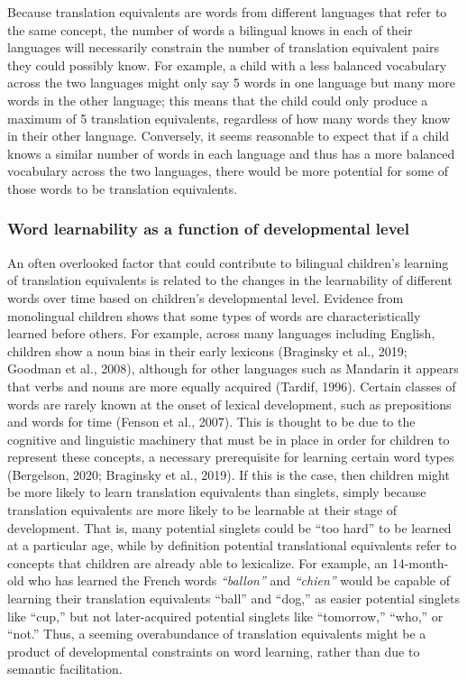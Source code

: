 \documentclass[
  english,
  ,man,floatsintext]{apa6}
\begin{document}
Because translation equivalents are words from different languages that refer to the same concept, the number of words a bilingual knows in each of their languages will necessarily constrain the number of translation equivalent pairs they could possibly know. For example, a child with a less balanced vocabulary across the two languages might only say 5 words in one language but many more words in the other language; this means that the child could only produce a maximum of 5 translation equivalents, regardless of how many words they know in their other language. Conversely, it seems reasonable to expect that if a child knows a similar number of words in each language and thus has a more balanced vocabulary across the two languages, there would be more potential for some of those words to be translation equivalents.

\hypertarget{word-learnability-as-a-function-of-developmental-level}{%
\subsubsection{Word learnability as a function of developmental level}\label{word-learnability-as-a-function-of-developmental-level}}

An often overlooked factor that could contribute to bilingual children's learning of translation equivalents is related to the changes in the learnability of different words over time based on children's developmental level. Evidence from monolingual children shows that some types of words are characteristically learned before others. For example, across many languages including English, children show a noun bias in their early lexicons (Braginsky et al., 2019; Goodman et al., 2008), although for other languages such as Mandarin it appears that verbs and nouns are more equally acquired (Tardif, 1996). Certain classes of words are rarely known at the onset of lexical development, such as prepositions and words for time (Fenson et al., 2007). This is thought to be due to the cognitive and linguistic machinery that must be in place in order for children to represent these concepts, a necessary prerequisite for learning certain word types (Bergelson, 2020; Braginsky et al., 2019). If this is the case, then children might be more likely to learn translation equivalents than singlets, simply because translation equivalents are more likely to be learnable at their stage of development. That is, many potential singlets could be ``too hard'' to be learned at a particular age, while by definition potential translational equivalents refer to concepts that children are already able to lexicalize. For example, an 14-month-old who has learned the French words \emph{``ballon''} and \emph{``chien''} would be capable of learning their translation equivalents ``ball'' and ``dog,'' as easier potential singlets like ``cup,'' but not later-acquired potential singlets like ``tomorrow,'' ``who,'' or ``not.'' Thus, a seeming overabundance of translation equivalents might be a product of developmental constraints on word learning, rather than due to semantic facilitation.
\end{document}
